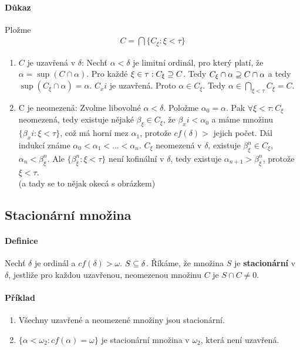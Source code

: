\documentclass[a4paper,12pt,titlepage]{article}
\begin{document}
\paragraph{Důkaz}
Pložme 
\begin{align}
	C = \bigcap \{C_\xi: \xi < \tau \}
\end{align}
\begin{enumerate}
	\item $C$ je uzavřená v $\delta$: Nechť $\alpha < \delta$ je limitní ordinál, pro
	který platí, že $\alpha = \sup(C \cap \alpha)$. Pro každé $\xi \in \tau:
	C_\xi \supseteq C$. Tedy $C_\xi \cap \alpha \supseteq C \cap \alpha$ a tedy
	$\sup(C_\xi \cap \alpha) = \alpha$. $C_xi$ je uzavřená. Proto $\alpha \in
	C_\xi$.
	Tedy $\alpha \in \bigcap_{\xi < \tau} C_\xi = C$.
	\item C je neomezená: Zvolme libovolné $\alpha < \delta$. Položme $\alpha_0
	= \alpha$. Pak
	$\forall \xi < \tau: C_\xi$ neomezená, tedy existuje nějaké $\beta_\xi \in
	C_\xi$, že $\beta_xi < \alpha_0$ a máme množinu $\{ \beta_xi : \xi < \tau
	\}$,
	což má horní mez $\alpha_1$, protože $cf(\delta) >$ jejich počet. Dál indukcí
	známe $\alpha_0 < \alpha_1 < ... < \alpha_n$. $C_\xi$ neomezená v $\delta$,
	existuje $\beta_\xi^n \in C_\xi$, $\alpha_n < \beta_\xi^n$. Ale $\{ \beta_\xi^n :
	\xi < \tau \}$ není kofinální v $\delta$, tedy existuje $\alpha_{n+1} >
	\beta_\xi^n$, protože $\xi < \tau$. \\
	(a tady se to nějak okecá s obrázkem)
\end{enumerate}

\subsection{Stacionární množina}
\setcounter{equation}{0}
\paragraph{Definice}
Nechť $\delta$ je ordinál a $cf(\delta) > \omega$. $S \subseteq \delta$. Říkáme, že
množina $S$ je \textbf{stacionární} v $\delta$, jestliže pro každou uzavřenou,
neomezenou množinu $C$ je $S \cap C \neq 0$.
\paragraph{Příklad}
\begin{enumerate}
	\item Všechny uzavřené a neomezené množiny jsou stacionární.
	\item $\{\alpha < \omega_2: cf(\alpha) = \omega\}$ je stacionární množina v
	$\omega_2$,	která není uzavřená.
\end{enumerate}
\end{document}
